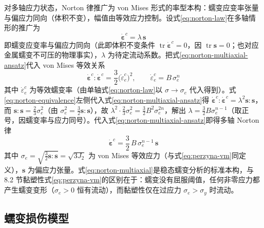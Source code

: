 对多轴应力状态，Norton 律推广为 von Mises 形式的率型本构：蠕变应变率张量与偏应力同向（体积不变），幅值由等效应力控制。设式\eqref{eq:norton-law}在多轴情形的推广为
\begin{equation}
  \dot{\boldsymbol{\varepsilon}}^{c}=\lambda\,\mathbf{s}
  \label{eq:norton-multiaxial-ansatz}
\end{equation}
即蠕变应变率与偏应力同向（此即体积不变条件 $\operatorname{tr}\dot{\boldsymbol{\varepsilon}}^{c}=0$，因 $\operatorname{tr}\mathbf{s}=0$；也对应金属蠕变不可压的物理事实），$\lambda$ 为待定流动系数。把式\eqref{eq:norton-multiaxial-ansatz}代入 von Mises 等效关系
\begin{equation}
  \dot{\boldsymbol{\varepsilon}}^{c}:\dot{\boldsymbol{\varepsilon}}^{c}
  =\frac{3}{2}\bigl(\dot{\varepsilon}^{c}_{e}\bigr)^{2},
  \qquad
  \dot{\varepsilon}^{c}_{e}=B\,\sigma_{e}^{n}
  \label{eq:norton-equivalence}
\end{equation}
其中 $\dot{\varepsilon}^{c}_{e}$ 为等效蠕变率（由单轴式\eqref{eq:norton-law}以 $\sigma\to\sigma_{e}$ 代入得到）。式\eqref{eq:norton-equivalence}左侧代入式\eqref{eq:norton-multiaxial-ansatz}得 $\dot{\boldsymbol{\varepsilon}}^{c}:\dot{\boldsymbol{\varepsilon}}^{c}=\lambda^{2}\mathbf{s}:\mathbf{s}$，而 $\mathbf{s}:\mathbf{s}=\tfrac{2}{3}\sigma_{e}^{2}$（由 $\sigma_{e}^{2}=\tfrac{3}{2}\mathbf{s}:\mathbf{s}$），故 $\lambda^{2}\cdot\tfrac{2}{3}\sigma_{e}^{2}=\tfrac{3}{2}B^{2}\sigma_{e}^{2n}$，解出 $\lambda=\tfrac{3}{2}B\sigma_{e}^{n-1}$（取正号，因蠕变率与应力同号）。代入式\eqref{eq:norton-multiaxial-ansatz}即得多轴 Norton 律
\begin{equation}
  \dot{\boldsymbol{\varepsilon}}^{c}
  =\frac{3}{2}\,B\,\sigma_{e}^{n-1}\,\mathbf{s}
  \label{eq:norton-multiaxial}
\end{equation}
其中 $\sigma_{e}=\sqrt{\tfrac{3}{2}\mathbf{s}:\mathbf{s}}=\sqrt{3J_{2}}$ 为 von Mises 等效应力（与式\eqref{eq:perzyna-vm}同定义），$\mathbf{s}$ 为偏应力张量。式\eqref{eq:norton-multiaxial}是稳态蠕变分析的标准本构，与 8.2 节黏塑性式\eqref{eq:perzyna-vm}的区别在于：蠕变没有屈服阈值，任何非零应力都产生蠕变变形（$\sigma_{e}>0$ 恒有流动），而黏塑性仅在过应力 $\sigma_{e}>\sigma_{y}$ 时流动。

\subsection{蠕变损伤模型}\label{sec:creep-damage}

